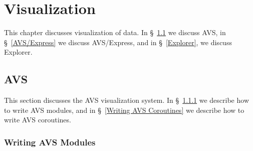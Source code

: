 
\chapter{Visualization}
\label{Visualization}

This chapter discusses visualization of \parflow{} data.
In \S~\ref{AVS} we discuss AVS,
in \S~\ref{AVS/Express} we discuss AVS/Express, and
in \S~\ref{Explorer}, we discuss Explorer.


\section{AVS}
\label{AVS}

This section discusses the AVS visualization system.
In \S~\ref{Writing AVS Modules} we describe how to write AVS modules, and
in \S~\ref{Writing AVS Coroutines} we describe how to write AVS coroutines.


\subsection{Writing AVS Modules}
\label{Writing AVS Modules}

